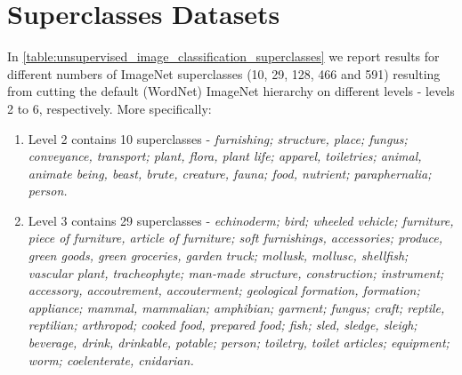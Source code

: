 \documentclass[runningheads]{llncs}
\begin{document}
\newpage
\section{Superclasses Datasets}
\label{section:superclassess_datasets}

In \cref{table:unsupervised_image_classification_superclasses} we report results for different numbers of ImageNet superclasses (10, 29, 128, 466 and 591) resulting from cutting the default (WordNet) ImageNet hierarchy on different levels - levels 2 to 6, respectively. More specifically:
\begin{enumerate}
    \item Level 2 contains 10 superclasses -  \textit{furnishing; structure, place; fungus; conveyance, transport; plant, flora, plant life; apparel, toiletries; animal, animate being, beast, brute, creature, fauna; food, nutrient; paraphernalia; person.}
    \item Level 3 contains 29 superclasses - \textit{echinoderm; bird; wheeled vehicle; furniture, piece of furniture, article of furniture; soft furnishings, accessories; produce, green goods, green groceries, garden truck; mollusk, mollusc, shellfish; vascular plant, tracheophyte; man-made structure, construction; instrument; accessory, accoutrement, accouterment; geological formation, formation; appliance; mammal, mammalian; amphibian; garment; fungus; craft; reptile, reptilian; arthropod; cooked food, prepared food; fish; sled, sledge, sleigh; beverage, drink, drinkable, potable; person; toiletry, toilet articles; equipment; worm; coelenterate, cnidarian.}

\end{enumerate}
\end{document}
